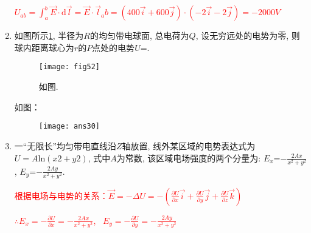 \begin{enumerate}
    \begin{note}
        \textcolor{red}{$U_{ab}=\int_a^b \vec{E}\cdot \mathrm{d} \vec{l}=\vec{E}\cdot \vec{l}_ab=(400\vec{i}+600\vec{j})\cdot (-2\vec{i}-2\vec{j})=-2000V$}
    \end{note}
    \item 如图所示\ref{Fig:52}, 半径为$R$的均匀带电球面, 总电荷为$Q$, 设无穷远处的电势为零, 则球内距离球心为$r$的$P$点处的电势$U$=. 
    \begin{figure}[H]
        \centering
        \texttt{[image: fig52]}
        \caption{如图.}\label{Fig:52}
    \end{figure}
    \begin{note}
        如图：
        \begin{figure}[H]
            \centering
            \texttt{[image: ans30]}
        \end{figure}
    \end{note}
    \item 一“无限长”均匀带电直线沿$Z$轴放置, 线外某区域的电势表达式为$U=A\mathrm{ln}(x2+y2)$, 式中$A$为常数, 该区域电场强度的两个分量为: $E_x$=\underline{$-\frac{2Ax}{x^2+y^2}$}, $E_y$=\underline{$-\frac{2Ay}{x^2+y^2}$}.
    \begin{note}
        \textcolor{red}{根据电场与电势的关系：$\vec{E}=-\Delta U=-\left(\frac{\partial U}{\partial x}\vec{i}+\frac{\partial U}{\partial y}\vec{j}+\frac{\partial U}{\partial z}\vec{k}\right)$}\par
        \textcolor{red}{$\therefore E_x = -\frac{\partial U}{\partial x}=-\frac{2Ax}{x^2+y^2}$, \ $E_y = -\frac{\partial U}{\partial y}=-\frac{2Ay}{x^2+y^2}$}
    \end{note}
\end{enumerate}
